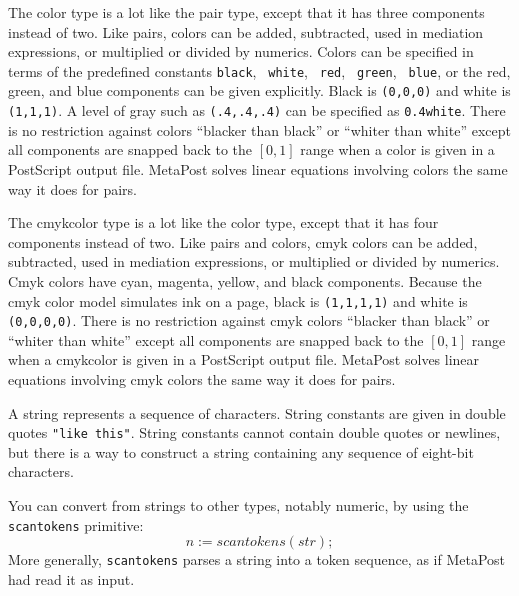 \documentclass{article} %
\def\ttindex#1{{\tt #1}\index{#1?\texttt{#1}}}
\begin{document}
The color type is a lot like the pair type, except
that it has three components instead of two.  Like pairs, colors can be
added, subtracted, used in mediation expressions, or multiplied or
divided by numerics.  Colors can be specified in terms of the predefined
constants {\tt black}\label{Dblack}, {\tt
white}\label{Dwhite}, {\tt
red}\label{Dred}, {\tt
green}\label{Dgreen}, {\tt
blue}\label{Dblue}, or the red, green, and
blue components can be given explicitly.  Black is {\tt (0,0,0)} and
white is {\tt (1,1,1)}.  A level of gray such as {\tt (.4,.4,.4)} can be
specified as {\tt 0.4white}.  There is no restriction against colors
``blacker than black'' or ``whiter than white'' except all components
are snapped back to the $[0,1]$ range when a color is given in a
PostScript output file.  MetaPost solves linear
equations involving colors the same way it does for pairs.

The cmykcolor type is a lot like the color type,
except that it has four components instead of two.  Like pairs and
colors, cmyk colors can be added, subtracted, used in mediation
expressions, or multiplied or divided by numerics.  Cmyk colors have
cyan, magenta, yellow, and black components.  Because the cmyk color
model simulates ink on a page, black is {\tt (1,1,1,1)} and white is
{\tt (0,0,0,0)}.  There is no restriction against cmyk colors
``blacker than black'' or ``whiter than white'' except all components
are snapped back to the $[0,1]$ range when a cmykcolor is given in a
PostScript output file.  MetaPost solves linear
equations involving cmyk colors the same way it does for pairs.

A string represents a sequence of characters.
String constants are given
in double quotes \hbox{\verb|"like this"|}.  String constants cannot contain
double quotes or newlines, but there is a way to construct a string containing
any sequence of eight-bit characters.

\label{Dscantokens}
You can convert from strings to other types, notably numeric, by using
the \ttindex{scantokens} primitive:
$$ n := scantokens (str); $$
More generally, \texttt{scantokens} parses a string into a token
sequence, as if MetaPost had read it as input.
\end{document}
